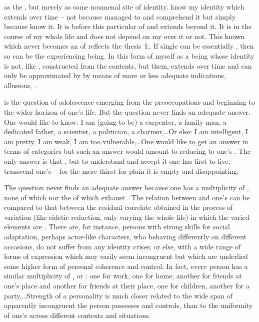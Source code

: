    as  the \hoa, but merely as
some noumenal site of identity.   know my identity which extends over time
-- not because  managed to  and {comprehend} it but
simply because  know it. It is  before this particular
 of  and extends beyond it. It is  in the
course of my whole life and does not depend on my  over it or not.
This known  which never becomes an  of 
reflects the thesis~I:. If single  can be
essentially , then so can be the experiencing being. In this form
of    myself as a being whose identity is
not, like , constructed from the  contents, but
 them, extends over time and can only be approximated by
 by means of more or less adequate indications, allusions,
.
%


\pa
{} is the question of adolescence emerging from the
 preoccupations and beginning to  the wider horizon of one's
life. But the question never finds an adequate answer. One would like to know: I
am (going to be) a carpenter, a family man, a dedicated father, a scientist, a
politician, a charmer,\ldots Or else: I am intelligent, I am pretty, I am weak, I am
too vulnerable,\dots One would like to get an answer in terms of  categories but such an answer would amount to reducing  to
one's . The only answer is that , but to understand and
accept it one has first to live, transcend one's  -- for the mere
 thirst for plain  it is empty and disappointing.  

The question never finds an adequate answer because one has a multiplicity of
, none of which nor the  of which exhaust . 
The relation between  and one's  can 
be compared to that between the residual correlate obtained in the process of
variation (like eidetic reduction, only varying the whole life) in which the
varied elements are . There are, for instance, persons with strong
skills for social adaptation, perhaps actor-like characters, who behaving
differently on different occasions, do not suffer from any identity crises; or
else,  with a wide range of forms of expression
which may easily seem incongruent but which are underlied some higher form of
personal coherence and control. In fact, every person has a similar multiplicity of , or
: one for work, one for home, another for friends at one's place
and another for friends at their place, one for children, another for a
party,\ldots Strength of a personality is much closer related to the wide span of
apparently incongruent  the person possesses and controls, than to the
uniformity of one's  across different contexts and situations.

